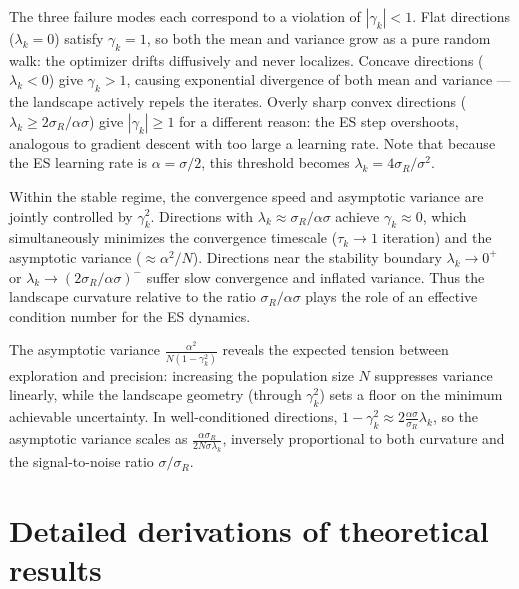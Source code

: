       \begin{remark}
      The three failure modes each correspond to a violation of $|\gamma_k|<1$. Flat directions ($\lambda_k = 0$) satisfy $\gamma_k = 1$, so both the mean and variance grow as a pure random walk: the optimizer drifts diffusively and never localizes. Concave directions ($\lambda_k < 0$) give $\gamma_k > 1$, causing exponential divergence of both mean and variance --- the landscape actively repels the iterates. Overly sharp convex directions ($\lambda_k \geq 2\sigma_R/\alpha\sigma$) give $|\gamma_k| \geq 1$ for a different reason: the ES step overshoots, analogous to gradient descent with too large a learning rate. Note that because the ES learning rate is $\alpha = \sigma/2$, this threshold becomes $\lambda_k = 4\sigma_R/\sigma^2$.
      \end{remark}
      
      \begin{remark}
      Within the stable regime, the convergence speed and asymptotic variance are jointly controlled by $\gamma_k^2$. Directions with $\lambda_k \approx \sigma_R/\alpha\sigma$ achieve $\gamma_k \approx 0$, which simultaneously minimizes the convergence timescale ($\tau_k \to 1$ iteration) and the asymptotic variance ($\approx \alpha^2/N$). Directions near the stability boundary $\lambda_k \to 0^+$ or $\lambda_k \to (2\sigma_R/\alpha\sigma)^-$ suffer slow convergence and inflated variance. Thus the landscape curvature relative to the ratio $\sigma_R/\alpha\sigma$ plays the role of an effective condition number for the ES dynamics.
      \end{remark}
      
      \begin{remark}
      The asymptotic variance $\frac{\alpha^2}{N(1-\gamma_k^2)}$ reveals the expected tension between exploration and precision: increasing the population size $N$ suppresses variance linearly, while the landscape geometry (through $\gamma_k^2$) sets a floor on the minimum achievable uncertainty. In well-conditioned directions, $1 - \gamma_k^2 \approx 2\frac{\alpha\sigma}{\sigma_R}\lambda_k$, so the asymptotic variance scales as $\frac{\alpha\sigma_R}{2N\sigma\lambda_k}$, inversely proportional to both curvature and the signal-to-noise ratio $\sigma/\sigma_R$.
      \end{remark}
        
    
    
    \section{Detailed derivations of theoretical results}
    
